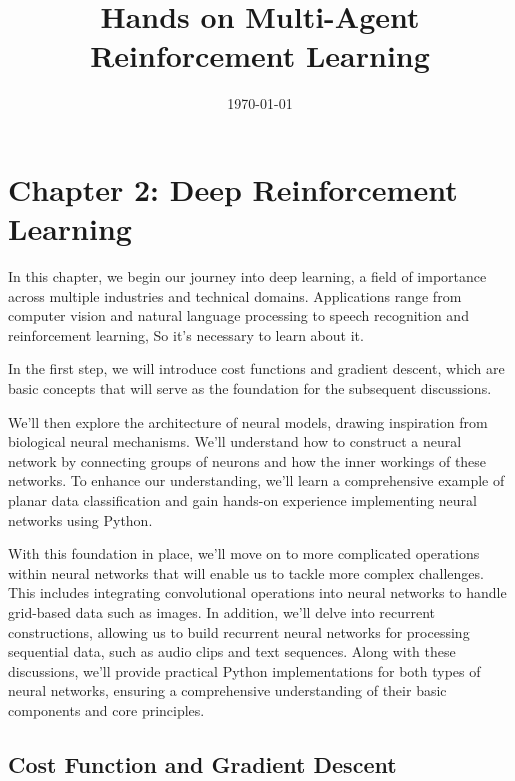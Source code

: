 \documentclass{article}
\begin{document}
	
	\title{Hands on Multi-Agent Reinforcement Learning}
	
	\date{\today}
	
	\maketitle
	
	\tableofcontents  %
	\clearpage  %
    
	\newpage
	\section{Chapter 2: Deep Reinforcement Learning }
    \setcounter{section}{2}

    In this chapter, we begin our journey into deep learning, a field of importance across multiple industries and technical domains. Applications range from computer vision and natural language processing to speech recognition and reinforcement learning, So it's necessary to learn about it.

In the first step, we will introduce cost functions and gradient descent, which are basic concepts that will serve as the foundation for the subsequent discussions.

We'll then explore the architecture of neural models, drawing inspiration from biological neural mechanisms. We'll understand how to construct a neural network by connecting groups of neurons and how the inner workings of these networks. To enhance our understanding, we'll learn a comprehensive example of planar data classification and gain hands-on experience implementing neural networks using Python.

With this foundation in place, we'll move on to more complicated operations within neural networks that will enable us to tackle more complex challenges. This includes integrating convolutional operations into neural networks to handle grid-based data such as images. In addition, we'll delve into recurrent constructions, allowing us to build recurrent neural networks for processing sequential data, such as audio clips and text sequences. Along with these discussions, we'll provide practical Python implementations for both types of neural networks, ensuring a comprehensive understanding of their basic components and core principles.


    \newpage
	\subsection{Cost Function and Gradient Descent}
\end{document}
